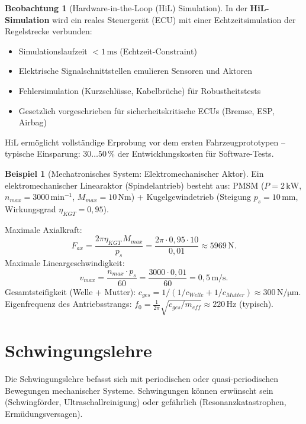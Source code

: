 ﻿\documentclass[a4paper,12pt]{report}
\theoremstyle{definition}
\newtheorem{beispiel}{Beispiel}
\newtheorem{beobachtung}{Beobachtung}
\begin{document}
\begin{beobachtung}[Hardware-in-the-Loop (HiL) Simulation]
In der \textbf{HiL-Simulation} wird ein reales Steuergerät (ECU)
mit einer Echtzeitsimulation der Regelstrecke verbunden:
\begin{itemize}
    \item[-] Simulationslaufzeit $< 1\,\mathrm{ms}$ (Echtzeit-Constraint)
    \item[-] Elektrische Signalschnittstellen emulieren Sensoren und Aktoren
    \item[-] Fehlersimulation (Kurzschlüsse, Kabelbrüche) für Robustheitstests
    \item[-] Gesetzlich vorgeschrieben für sicherheitskritische ECUs (Bremse, ESP, Airbag)
\end{itemize}
HiL ermöglicht vollständige Erprobung vor dem ersten Fahrzeugprototypen --
typische Einsparung: $30\ldots50\,\%$ der Entwicklungskosten für Software-Tests.
\end{beobachtung}

\begin{beispiel}[Mechatronisches System: Elektromechanischer Aktor]
Ein elektromechanischer Linearaktor (Spindelantrieb) besteht aus:
PMSM ($P = 2\,\mathrm{kW}$, $n_{max} = 3000\,\mathrm{min^{-1}}$, $M_{max} = 10\,\mathrm{Nm}$)
+ Kugelgewindetrieb (Steigung $p_s = 10\,\mathrm{mm}$, Wirkungsgrad $\eta_{KGT} = 0{,}95$).

Maximale Axialkraft:
\[
  F_{ax} = \frac{2\pi\eta_{KGT}\,M_{max}}{p_s} = \frac{2\pi\cdot0{,}95\cdot10}{0{,}01} \approx 5969\,\mathrm{N}.
\]
Maximale Lineargeschwindigkeit:
\[
  v_{max} = \frac{n_{max}\cdot p_s}{60} = \frac{3000\cdot0{,}01}{60} = 0{,}5\,\mathrm{m/s}.
\]
Gesamtsteifigkeit (Welle + Mutter):
$c_{ges} = 1/(1/c_{Welle} + 1/c_{Mutter}) \approx 300\,\mathrm{N/\mu m}$.
Eigenfrequenz des Antriebsstrangs:
$f_0 = \frac{1}{2\pi}\sqrt{c_{ges}/m_{eff}} \approx 220\,\mathrm{Hz}$ (typisch).
\end{beispiel}

\chapter{Schwingungslehre}

Die Schwingungslehre befasst sich mit periodischen oder quasi-periodischen
Bewegungen mechanischer Systeme. Schwingungen k\"onnen erw\"unscht sein
(Schwingf\"order, Ultraschallreinigung) oder gef\"ahrlich
(Resonanzkatastrophen, Erm\"udungsversagen).
\end{document}

